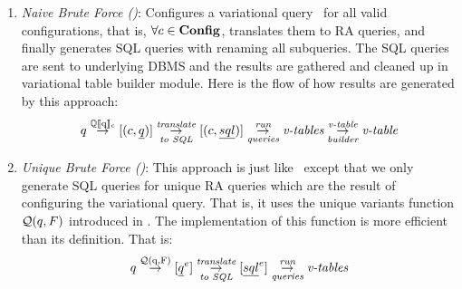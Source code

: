 \begin{enumerate}
\item
\emph{Naive Brute Force (\nbf)}:
Configures a variational query \vQ\ for all valid configurations, that is, 
\ensuremath{\forall \config \in \confSet}, translates them to RA queries,
and finally generates SQL queries with renaming all subqueries. The 
SQL queries are sent to underlying DBMS and the results are gathered and
cleaned up in variational table builder module. Here is the flow of how results are generated by 
this approach:
%
\[\vQ \mathrel{\mathop{\rightarrow}^{\mathrm{\eeSem \vQ}}} [ ( \config, \pQ ) ] 
\mathrel{\mathop{\rightarrow}^{\mathrm{\textit{translate}}}_{\mathrm{\textit{to SQL}}}} [ ( \config, \sqlQ ) ]
\mathrel{\mathop{\rightarrow}^{\mathrm{\textit{run}}}_{\mathrm{\textit{queries}}}} \textit{v-tables}
\mathrel{\mathop{\rightarrow}^{\mathrm{\textit{v-table}}}_{\mathrm{\textit{builder}}}} \textit{v-table}
\]
%
%
\item
\emph{Unique Brute Force (\ubf)}:
This approach is just like \nbf\ except that we only generate SQL 
queries for unique RA queries which are the result of configuring the variational query.
That is, it uses the unique variants function \ensuremath{\qGroup \vQ} introduced
in .
The implementation of this function is more efficient than its definition.
That is:
%
\[\vQ \mathrel{\mathop{\rightarrow}^{\mathrm{\qGroup \vQ}}} [ \annot [\dimMeta] {\pQ} ] 
\mathrel{\mathop{\rightarrow}^{\mathrm{\textit{translate}}}_{\mathrm{\textit{to SQL}}}} [ \annot [\dimMeta] {\sqlQ} ]
\mathrel{\mathop{\rightarrow}^{\mathrm{\textit{run}}}_{\mathrm{\textit{queries}}}} \textit{v-tables}
\]
\end{enumerate}
